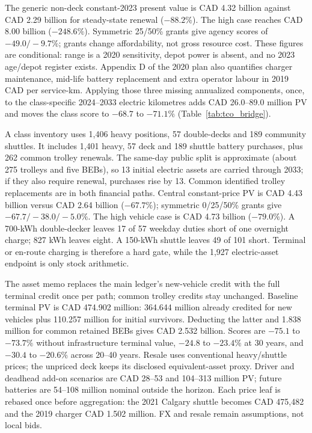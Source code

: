 \documentclass[12pt,letterpaper]{article}
\begin{document}


The generic non-deck constant-2023 present value is CAD 4.32 billion against CAD 2.29 billion for steady-state renewal ($-88.2\%$). The high case reaches CAD 8.00 billion ($-248.6\%$). Symmetric 25/50\% grants give agency scores of $-49.0/-9.7\%$; grants change affordability, not gross resource cost. These figures are conditional: range is a 2020 sensitivity, depot power is absent, and no 2023 age/depot register exists. Appendix D of the 2020 plan also quantifies charger maintenance, mid-life battery replacement and extra operator labour in 2019 CAD per service-km. Applying those three missing annualized components, once, to the class-specific 2024--2033 electric kilometres adds CAD 26.0--89.0 million PV and moves the class score to $-68.7$ to $-71.1\%$ (Table~\ref{tab:tco_bridge}).\cite{fleet2020}



A class inventory uses 1,406 heavy positions, 57 double-decks and 189 community shuttles. It includes 1,401 heavy, 57 deck and 189 shuttle battery purchases, plus 262 common trolley renewals. The same-day public split is approximate (about 275 trolleys and five BEBs), so 13 initial electric assets are carried through 2033; if they also require renewal, purchases rise by 13. Common identified trolley replacements are in both financial paths. Central constant-price PV is CAD 4.43 billion versus CAD 2.64 billion ($-67.7\%$); symmetric 0/25/50\% grants give $-67.7/-38.0/-5.0\%$. The high vehicle case is CAD 4.73 billion ($-79.0\%$). A 700-kWh double-decker leaves 17 of 57 weekday duties short of one overnight charge; 827 kWh leaves eight. A 150-kWh shuttle leaves 49 of 101 short. Terminal or en-route charging is therefore a hard gate, while the 1,927 electric-asset endpoint is only stock arithmetic.\cite{board2023,translink2019deck,foothill2024,greenpower2023,endera2023,playbook2024,budget2025,budget2026}




The asset memo replaces the main ledger's new-vehicle credit with the full terminal credit once per path; common trolley credits stay unchanged. Baseline terminal PV is CAD 474.902 million: 364.644 million already credited for new vehicles plus 110.257 million for initial survivors. Deducting the latter and 1.838 million for common retained BEBs gives CAD 2.532 billion. Scores are $-75.1$ to $-73.7\%$ without infrastructure terminal value, $-24.8$ to $-23.4\%$ at 30 years, and $-30.4$ to $-20.6\%$ across 20--40 years. Resale uses conventional heavy/shuttle prices; the unpriced deck keeps its disclosed equivalent-asset proxy. Driver and deadhead add-on scenarios are CAD 28--53 and 104--313 million PV; future batteries are 54--108 million nominal outside the horizon. Each price leaf is rebased once before aggregation: the 2021 Calgary shuttle becomes CAD 475,482 and the 2019 charger CAD 1.502 million. FX and resale remain assumptions, not local bids.
\end{document}
